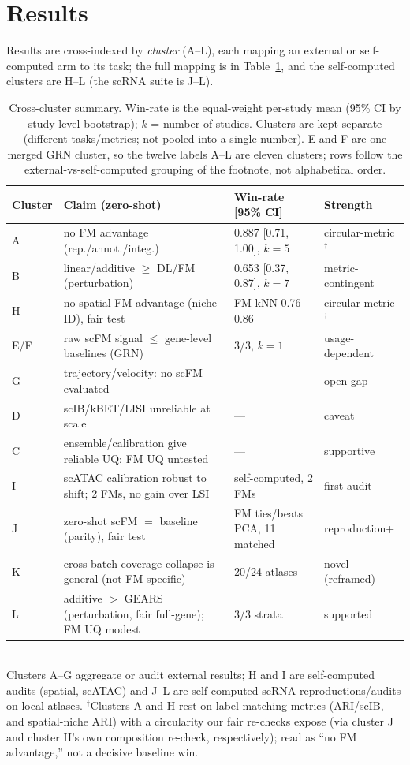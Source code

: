 \documentclass[11pt]{article}
\begin{document}
\FloatBarrier
\section{Results}
\noindent Results are cross-indexed by \emph{cluster} (A--L), each mapping an external or self-computed arm to its task; the full mapping is in Table~\ref{tab:clusters}, and the self-computed clusters are H--L (the scRNA suite is J--L).

\begin{table}[!ht]\centering\footnotesize
\caption{Cross-cluster summary. Win-rate is the equal-weight per-study mean (95\% CI by study-level bootstrap); $k$ = number of studies. Clusters are kept separate (different tasks/metrics; not pooled into a single number). E and F are one merged GRN cluster, so the twelve labels A--L are eleven clusters; rows follow the external-vs-self-computed grouping of the footnote, not alphabetical order.}
\label{tab:clusters}
\begin{tabular}{@{}l p{6.1cm} p{3.1cm} l@{}}
\toprule
Cluster & Claim (zero-shot) & Win-rate [95\% CI] & Strength \\
\midrule
A & no FM advantage (rep./annot./integ.) & 0.887 [0.71, 1.00], $k{=}5$ & circular-metric$^\dagger$ \\
B & linear/additive $\geq$ DL/FM (perturbation) & 0.653 [0.37, 0.87], $k{=}7$ & metric-contingent \\
H & no spatial-FM advantage (niche-ID), fair test & FM kNN 0.76--0.86 & circular-metric$^\dagger$ \\
E/F & raw scFM signal $\leq$ gene-level baselines (GRN) & 3/3, $k{=}1$ & usage-dependent \\
G & trajectory/velocity: no scFM evaluated & --- & open gap \\
D & scIB/kBET/LISI unreliable at scale & --- & caveat \\
C & ensemble/calibration give reliable UQ; FM UQ untested & --- & supportive \\
I & scATAC calibration robust to shift; 2 FMs, no gain over LSI & self-computed, 2 FMs & first audit \\
\midrule
J & zero-shot scFM $=$ baseline (parity), fair test & FM ties/beats PCA, 11 matched & reproduction+ \\
K & cross-batch coverage collapse is general (not FM-specific) & 20/24 atlases & novel (reframed) \\
L & additive $>$ GEARS (perturbation, fair full-gene); FM UQ modest & 3/3 strata & supported \\
\bottomrule
\end{tabular}
\\[2pt]
\footnotesize Clusters A--G aggregate or audit external results; H and I are self-computed audits (spatial, scATAC) and J--L are self-computed scRNA reproductions/audits on local atlases. $^\dagger$Clusters A and H rest on label-matching metrics (ARI/scIB, and spatial-niche ARI) with a circularity our fair re-checks expose (via cluster J and cluster H's own composition re-check, respectively); read as ``no FM advantage,'' not a decisive baseline win.
\end{table}
\end{document}
